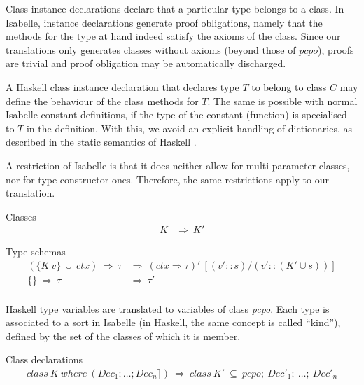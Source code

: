 \documentclass{llncs}
\begin{document}
Class instance declarations declare that a particular type belongs to
a class. In Isabelle, instance declarations generate proof
obligations, namely that the methods for the type at hand indeed
satisfy the axioms of the class. Since our translations only
generates classes without axioms (beyond those of $pcpo$), proofs are trivial and proof obligation
may be automatically discharged.


A Haskell class instance declaration that declares type $T$
to belong to class $C$ may define the behaviour of the
class methods for $T$. The same is possible with
normal Isabelle constant definitions, if the type of the
constant (function) is specialised to $T$ in the definition.
With this, we avoid an explicit handling of dictionaries, as
described in the static semantics of Haskell \cite{journals/jfp/Faxen02}.



A restriction of Isabelle is that it does neither allow for
multi-parameter classes, nor for type constructor ones. Therefore, the
same restrictions apply to our translation.



\noindent Classes
$$\begin{array}{ll}
  K & \Longrightarrow \ K' 
\end{array}$$

\noindent Type schemas
$$\begin{array}{ll} 
  (\{K \ v\} \ \cup \ ctx) \ \Rightarrow \ \tau & \Longrightarrow 
  \ (ctx \Rightarrow \tau)'  
           \ [(v'::s) / (v'::({K'} \cup s))]  \\
  \{\} \ \Rightarrow \ \tau & \Longrightarrow \ \tau'
\end{array}$$\\

Haskell type variables are translated to variables of class
\emph{pcpo}.  Each type is associated to a sort in Isabelle (in
Haskell, the same concept is called ``kind''), defined by the set of
the classes of which it is member.  
\medskip

\noindent Class declarations
$$\begin{array}{l} class \ K \ where \ (Dec_1; \ldots; Dec_n \rceil) \ 
  \Longrightarrow \ class \ K' \ \subseteq
  \ pcpo; \ Dec'_1; \ \ldots; \ Dec'_n \\
\end{array}$$
        
\end{document}
